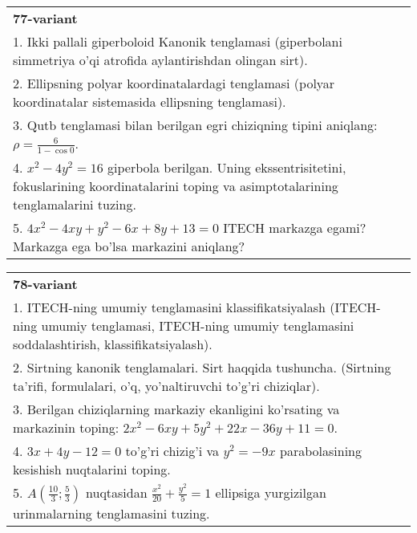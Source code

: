 \documentclass{article}
\begin{document}
\begin{tabular}{m{17cm}}
\textbf{77-variant}\\
1. Ikki pallali giperboloid Kanonik tenglamasi (giperbolani simmetriya o'qi atrofida aylantirishdan olingan sirt).\\

2. Ellipsning polyar koordinatalardagi tenglamasi (polyar koordinatalar sistemasida ellipsning tenglamasi).\\

3. Qutb tenglamasi bilan berilgan egri chiziqning tipini aniqlang: $\rho=\frac{6}{1-\cos 0}$.\\

4. $x^{2} - 4y^{2} = 16$ giperbola berilgan. Uning ekssentrisitetini, fokuslarining koordinatalarini toping va asimptotalarining tenglamalarini tuzing.\\

5. $4x^{2} - 4xy + y^{2} - 6x + 8y + 13 = 0$ ITECH markazga egami? Markazga ega bo'lsa markazini aniqlang?  
\end{tabular}
\vspace{1cm}


\begin{tabular}{m{17cm}}
\textbf{78-variant}\\
1. ITECH-ning umumiy tenglamasini klassifikatsiyalash (ITECH-ning umumiy tenglamasi, ITECH-ning umumiy tenglamasini soddalashtirish, klassifikatsiyalash).\\

2. Sirtning kanonik tenglamalari. Sirt haqqida tushuncha. (Sirtning ta'rifi, formulalari, o'q, yo'naltiruvchi to'g'ri chiziqlar).\\

3. Berilgan chiziqlarning markaziy ekanligini ko'rsating va markazinin toping: $2x^{2}-6xy+5y^{2}+22x-36y+11=0$.\\

4. $3x + 4y - 12 = 0$ to'g'ri chizig'i va $y^{2} = - 9x$ parabolasining kesishish nuqtalarini toping.\\

5. $A(\frac{10}{3};\frac{5}{3})$ nuqtasidan $\frac{x^{2}}{20} + \frac{y^{2}}{5} = 1$ ellipsiga yurgizilgan urinmalarning tenglamasini tuzing.  
\end{tabular}
\vspace{1cm}
\end{document}
